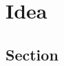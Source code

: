 \documentclass[Thesis.tex]{subfiles}
\begin{document}
\chapter{Idea}
\section{Section}
\end{document}
